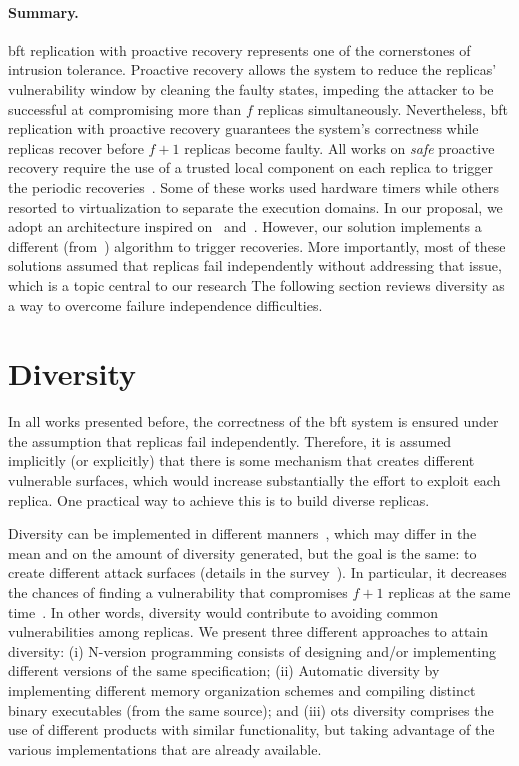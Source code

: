 \paragraph{Summary.} 
\gls{bft} replication with proactive recovery represents one of the cornerstones of intrusion tolerance. 
Proactive recovery allows the system to reduce the replicas' vulnerability window by cleaning the faulty states, impeding the attacker to be successful at compromising more than $f$ replicas simultaneously. 
Nevertheless, \gls{bft} replication with proactive recovery guarantees the system's correctness while replicas recover before $f+1$ replicas become faulty. 
All works on \emph{safe} proactive recovery require the use of a trusted local component on each replica to trigger the periodic recoveries~\cite{Castro:2002,Sousa:2010,Roeder:2010,Platania:2014,Distler:2011}.
Some of these works used hardware timers while others resorted to virtualization to separate the execution domains. 
In our proposal, we adopt an architecture inspired on~\cite{Distler:2008} and~\cite{Sousa:2010}. 
However, our solution implements a different (from~\cite{Sousa:2010}) algorithm to trigger recoveries.
More importantly, most of these solutions assumed that replicas fail independently without addressing that issue, which is a topic central to our research
The following section reviews diversity as a way to overcome failure independence difficulties. 




\section{Diversity}
In all works presented before, the correctness of the \gls{bft} system is ensured under the assumption that replicas fail independently.
Therefore, it is assumed implicitly (or explicitly) that there is some mechanism that creates different vulnerable surfaces, which would increase substantially the effort to exploit each replica.
One practical way to achieve this is to build diverse replicas.

Diversity can be implemented in different manners~\cite{Deswarte:1998,Larsen:2015}, which may differ in the mean and on the amount of diversity generated, but the goal is the same: to create different attack surfaces (details in the survey~\cite{Baudry:2015}).
In particular, it decreases the chances of finding a vulnerability that compromises $f+1$ replicas at the same time~\cite{Castro:2002}.
In other words, diversity would contribute to avoiding common vulnerabilities among replicas. 
We present three different approaches to attain diversity: 
(i) N-version programming consists of designing and/or implementing  different versions of the same specification; 
(ii) Automatic diversity by implementing different memory organization schemes and compiling distinct binary executables (from the same source); 
and (iii) \gls{ots} diversity comprises the use of different products with similar functionality, but taking advantage of the various implementations that are already available.


